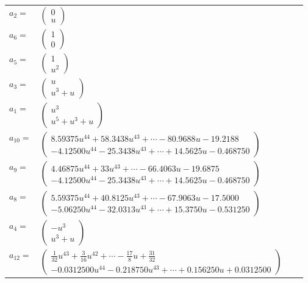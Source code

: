 \documentclass[1p]{elsarticle_modified}
\theoremstyle{definition}
\begin{document}
\begin{tabular}{m{7pt} m{180pt} m{7pt} m{180pt} }
\flushright $a_{2}=$&$\begin{pmatrix}0\\u\end{pmatrix}$ \\
\flushright $a_{6}=$&$\begin{pmatrix}1\\0\end{pmatrix}$ \\
\flushright $a_{5}=$&$\begin{pmatrix}1\\u^2\end{pmatrix}$ \\
\flushright $a_{3}=$&$\begin{pmatrix}u\\u^3+u\end{pmatrix}$ \\
\flushright $a_{1}=$&$\begin{pmatrix}u^3\\u^5+u^3+u\end{pmatrix}$ \\
\flushright $a_{10}=$&$\begin{pmatrix}8.59375 u^{44}+58.3438 u^{43}+\cdots-80.9688 u-19.2188\\-4.12500 u^{44}-25.3438 u^{43}+\cdots+14.5625 u-0.468750\end{pmatrix}$ \\
\flushright $a_{9}=$&$\begin{pmatrix}4.46875 u^{44}+33 u^{43}+\cdots-66.4063 u-19.6875\\-4.12500 u^{44}-25.3438 u^{43}+\cdots+14.5625 u-0.468750\end{pmatrix}$ \\
\flushright $a_{8}=$&$\begin{pmatrix}5.59375 u^{44}+40.8125 u^{43}+\cdots-67.9063 u-17.5000\\-5.06250 u^{44}-32.0313 u^{43}+\cdots+15.3750 u-0.531250\end{pmatrix}$ \\
\flushright $a_{4}=$&$\begin{pmatrix}- u^3\\u^3+u\end{pmatrix}$ \\
\flushright $a_{12}=$&$\begin{pmatrix}\frac{1}{32} u^{43}+\frac{3}{16} u^{42}+\cdots-\frac{17}{8} u+\frac{31}{32}\\-0.0312500 u^{44}-0.218750 u^{43}+\cdots+0.156250 u+0.0312500\end{pmatrix}$ \\

\end{tabular}
\end{document}
